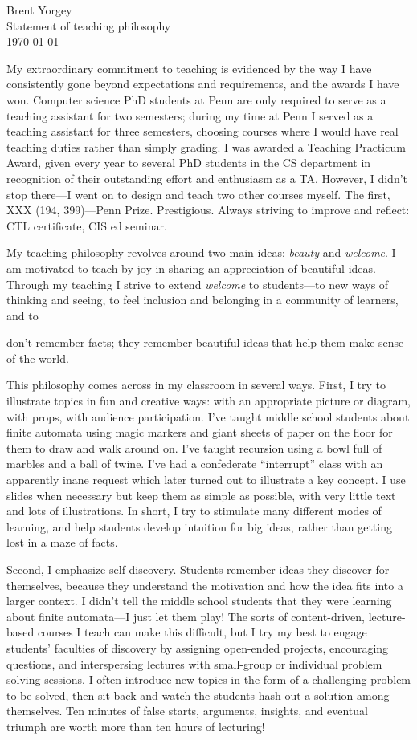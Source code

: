 \documentclass{article}
\begin{document}
\noindent Brent Yorgey \\
Statement of teaching philosophy \\
\today
\bigskip

My extraordinary commitment to teaching is evidenced by the way I have
consistently gone beyond expectations and requirements, and the awards
I have won.  Computer science PhD students at Penn are only required
to serve as a teaching assistant for two semesters; during my time at
Penn I served as a teaching assistant for three semesters, choosing
courses where I would have real teaching duties rather than simply
grading.  I was awarded a Teaching Practicum Award, given every year
to several PhD students in the CS department in recognition of their
outstanding effort and enthusiasm as a TA.  However, I didn't stop
there---I went on to design and teach two other courses myself. The
first, XXX
(194, 399)---Penn
Prize.  Prestigious.  Always striving to improve and reflect: CTL
certificate, CIS ed seminar.


My teaching philosophy revolves around two main ideas: \emph{beauty}
and \emph{welcome}.  I am motivated to teach by joy in sharing an
appreciation of beautiful ideas.  Through my teaching I strive to
extend \emph{welcome} to students---to new ways of thinking and
seeing, to feel inclusion and belonging in a community of learners,
and to

  don't remember facts; they remember beautiful
ideas that help them make sense of the world.

This philosophy comes across in my classroom in several ways. First, I
try to illustrate topics in fun and creative ways: with an appropriate
picture or diagram, with props, with audience participation.  I've
taught middle school students about finite automata using magic
markers and giant sheets of paper on the floor for them to draw and
walk around on.  I've taught recursion using a bowl full of marbles
and a ball of twine.  I've had a confederate ``interrupt'' class with
an apparently inane request which later turned out to illustrate a key
concept.  I use slides when necessary but keep them as simple as
possible, with very little text and lots of illustrations.  In short,
I try to stimulate many different modes of learning, and help students
develop intuition for big ideas, rather than getting lost in a maze of
facts.

Second, I emphasize self-discovery. Students remember ideas they
discover for themselves, because they understand the motivation and
how the idea fits into a larger context. I didn't tell the middle
school students that they were learning about finite automata---I just
let them play! The sorts of content-driven, lecture-based courses I
teach can make this difficult, but I try my best to engage students'
faculties of discovery by assigning open-ended projects, encouraging
questions, and interspersing lectures with small-group or individual
problem solving sessions.  I often introduce new topics in the form of
a challenging problem to be solved, then sit back and watch the
students hash out a solution among themselves.  Ten minutes of false
starts, arguments, insights, and eventual triumph are worth more than
ten hours of lecturing!
\end{document}
